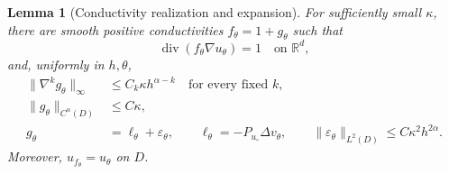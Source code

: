 \documentclass[11pt]{article}
\newtheorem{lemma}[theorem]{Lemma}
\theoremstyle{remark}
\newcommand{\R}{\mathbb R}
\DeclareMathOperator{\divergence}{div}
\begin{document}
\begin{lemma}[Conductivity realization and expansion]\label{lem:realization}
For sufficiently small \(\kappa\), there are smooth positive
conductivities \(f_\theta=1+g_\theta\) such that
\[
\divergence(f_\theta\nabla u_\theta)=1
\quad\text{on }\R^d,
\]
and, uniformly in \(h,\theta\),
\begin{align}
\|\nabla^kg_\theta\|_\infty
&\leq C_k\kappa h^{\alpha-k}
\quad\text{for every fixed }k,\label{eq:g-derivatives}\\
\|g_\theta\|_{C^\alpha(D)}
&\leq C\kappa,\label{eq:g-class}\\
g_\theta&=\ell_\theta+\varepsilon_\theta,\qquad
\ell_\theta=-P_{u_\circ}\Delta v_\theta,\qquad
\|\varepsilon_\theta\|_{L^2(D)}
\leq C\kappa^2h^{2\alpha}.
\label{eq:lower-expansion}
\end{align}
Moreover, \(u_{f_\theta}=u_\theta\) on \(D\).
\end{lemma}
\end{document}
